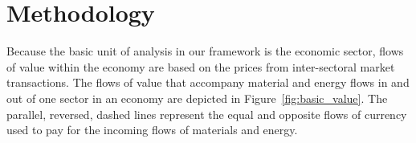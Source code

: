 


\section{Methodology}
\label{sec:Value_Methodology}
Because the basic unit of analysis in our framework is the economic sector, 
flows of value within the economy are based on the prices  
from inter-sectoral market transactions. 
The flows of value that accompany material and energy flows in and out 
of one sector in an economy are depicted in Figure~\ref{fig:basic_value}. The
parallel, reversed, dashed lines represent the equal and opposite
flows of currency used to pay for the incoming flows of 
materials and energy.

